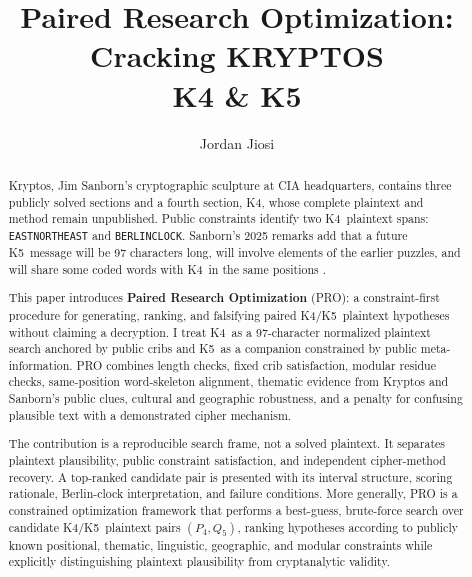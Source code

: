 \documentclass[12pt]{paperFormatting}
\title{Paired Research Optimization:\\Cracking KRYPTOS\\K4 \& K5}
\author{Jordan Jiosi}
\newcommand{\Kfour}{K4}
\newcommand{\Kfive}{K5}
\begin{document}
\begin{frontmatter}
\makeTitlePage

\begin{abstract}
\noindent Kryptos, Jim Sanborn's cryptographic sculpture at CIA headquarters, contains three publicly solved sections and a fourth section, \Kfour, whose complete plaintext and method remain unpublished. Public constraints identify two \Kfour\ plaintext spans: \texttt{EASTNORTHEAST} and \texttt{BERLINCLOCK}. Sanborn's 2025 remarks add that a future \Kfive\ message will be 97 characters long, will involve elements of the earlier puzzles, and will share some coded words with \Kfour\ in the same positions \cite{verganoFinalClues2025}.

This paper introduces \textbf{Paired Research Optimization} (PRO): a constraint-first procedure for generating, ranking, and falsifying paired \Kfour/\Kfive\ plaintext hypotheses without claiming a decryption. I treat \Kfour\ as a 97-character normalized plaintext search anchored by public cribs and \Kfive\ as a companion constrained by public meta-information. PRO combines length checks, fixed crib satisfaction, modular residue checks, same-position word-skeleton alignment, thematic evidence from Kryptos and Sanborn's public clues, cultural and geographic robustness, and a penalty for confusing plausible text with a demonstrated cipher mechanism.

The contribution is a reproducible search frame, not a solved plaintext. It separates plaintext plausibility, public constraint satisfaction, and independent cipher-method recovery. A top-ranked candidate pair is presented with its interval structure, scoring rationale, Berlin-clock interpretation, and failure conditions. More generally, PRO is a constrained optimization framework that performs a best-guess, brute-force search over candidate \Kfour/\Kfive\ plaintext pairs $(P_4,Q_5)$, ranking hypotheses according to publicly known positional, thematic, linguistic, geographic, and modular constraints while explicitly distinguishing plaintext plausibility from cryptanalytic validity.
\end{abstract}
\end{frontmatter}
\end{document}
